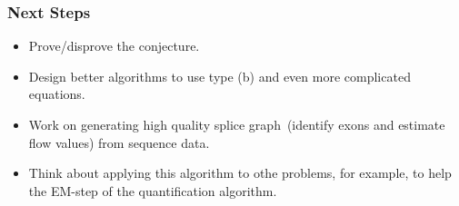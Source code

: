 \frame
{
	\frametitle{Next Steps}

	\begin{itemize}
	\item Prove/disprove the conjecture.
	\vspace{0.2cm}
	\item Design better algorithms to use type (b) and even more complicated equations.
	\vspace{0.2cm}
	\item Work on generating high quality splice graph~(identify exons and estimate
			flow values) from sequence data.
	\vspace{0.2cm}
	\item Think about applying this algorithm to othe problems, for example, to
		help the EM-step of the quantification algorithm.
	\end{itemize}
}
